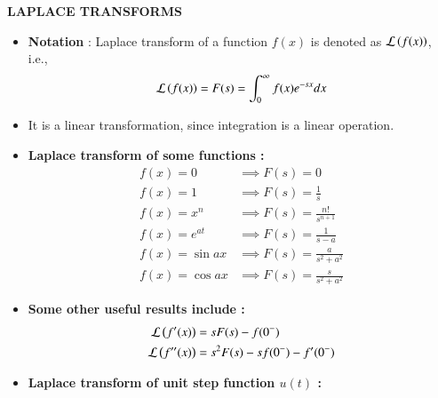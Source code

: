 \documentclass[journal]{IEEEtran}
\begin{document}
\textbf{LAPLACE TRANSFORMS} \\
\begin{itemize}
	\item \textbf{Notation} : Laplace transform of a function $f(x)$ is denoted as $\mathcal{L} \left(f(x)\right)$, i.e., 
		\begin{align}
			\mathcal{L} \left(f(x)\right) = F(s) = \int_{0}^{\infty} f(x) e^{-sx} dx \label{eq:lap} 
		\end{align}
	\item It is a linear transformation, since integration is a linear operation.
	\item \textbf{Laplace transform of some functions :} 
		\begin{align}
			f(x) = 0 &\implies F(s) = 0 \\
			f(x) = 1 &\implies F(s) = \frac{1}{s} \\
			f(x) = x^n &\implies F(s) = \frac{n!}{s^{n+1}} \\
			f(x) = e^{at} &\implies F(s) = \frac{1}{s-a} \\
			f(x) = \sin{ax} &\implies F(s) = \frac{a}{s^2 + a^2} \\
			f(x) = \cos{ax} &\implies F(s) = \frac{s}{s^2 + a^2}
		\end{align}
	\item \textbf{Some other useful results include :}
		\begin{align}
			\mathcal{L} \left(f^{\prime}(x)\right) &= s F(s) - f(0^{-}) \\
			\mathcal{L} \left(f^{\prime \prime}(x)\right) &= s^2 F(s) - s f(0^{-}) - f^{\prime}(0^{-}) 
		\end{align}
	\item \textbf{Laplace transform of unit step function $u(t)$ :} \\

\end{itemize}
\end{document}
